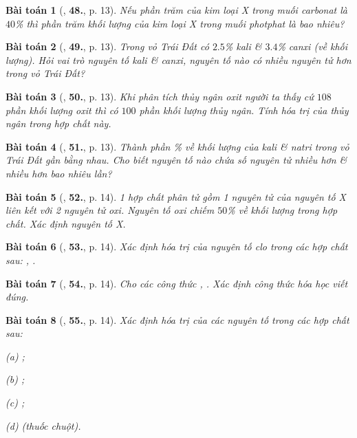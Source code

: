 \documentclass{article}
\numberwithin{equation}{section}
\newtheorem{baitoan}{Bài toán}[section]
\begin{document}
\begin{baitoan}[\cite{An2011}, \textbf{48.}, p. 13]
	Nếu phần trăm của kim loại X trong muối carbonat là $40$\% thì phần trăm khối lượng của kim loại X trong muối photphat là bao nhiêu?
\end{baitoan}

\begin{baitoan}[\cite{An2011}, \textbf{49.}, p. 13]
	Trong vỏ Trái Đất có $2.5$\% kali \& $3.4$\% canxi (về khối lượng). Hỏi vai trò nguyên tố kali \& canxi, nguyên tố nào có nhiều nguyên tử hơn trong vỏ Trái Đất?
\end{baitoan}

\begin{baitoan}[\cite{An2011}, \textbf{50.}, p. 13]
	Khi phân tích thủy ngân oxit người ta thấy cứ $108$ phần khối lượng oxit thì có $100$ phần khối lượng thủy ngân. Tính hóa trị của thủy ngân trong hợp chất này.
\end{baitoan}

\begin{baitoan}[\cite{An2011}, \textbf{51.}, p. 13]
	Thành phần \% về khối lượng của kali \& natri trong vỏ Trái Đất gần bằng nhau. Cho biết nguyên tố nào chứa số nguyên tử nhiều hơn \& nhiều hơn bao nhiêu lần?
\end{baitoan}

\begin{baitoan}[\cite{An2011}, \textbf{52.}, p. 14]
	1 hợp chất phân tử gồm 1 nguyên tử của nguyên tố X liên kết với 2 nguyên tử oxi. Nguyên tố oxi chiếm $50$\% về khối lượng trong hợp chất. Xác định nguyên tố X.
\end{baitoan}

\begin{baitoan}[\cite{An2011}, \textbf{53.}, p. 14]
	Xác định hóa trị của nguyên tố clo trong các hợp chất sau: , .
\end{baitoan}

\begin{baitoan}[\cite{An2011}, \textbf{54.}, p. 14]
	Cho các công thức , . Xác định công thức hóa học viết đúng.
\end{baitoan}

\begin{baitoan}[\cite{An2011}, \textbf{55.}, p. 14]
	Xác định hóa trị của các nguyên tố trong các hợp chất sau:
	\begin{enumerate*}
		\item[(a)] ;
		\item[(b)] ;
		\item[(c)] ;
		\item[(d)]  (thuốc chuột).
	\end{enumerate*}
\end{baitoan}
\end{document}
